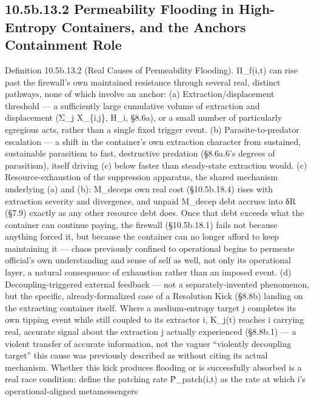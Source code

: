 \documentclass[
]{article}
\begin{document}
\hypertarget{b.13.2-permeability-flooding-in-high-entropy-containers-and-the-anchors-containment-role}{%
\subsection{10.5b.13.2 Permeability Flooding in High-Entropy Containers,
and the Anchors Containment
Role}\label{b.13.2-permeability-flooding-in-high-entropy-containers-and-the-anchors-containment-role}}

Definition 10.5b.13.2 (Real Causes of Permeability Flooding). Π\_f(i,t)
can rise past the firewall's own maintained resistance through several
real, distinct pathways, none of which involve an anchor: (a)
Extraction/displacement threshold --- a sufficiently large cumulative
volume of extraction and displacement (Σ\_j X\_\{i,j\}, H\_i, §8.6a), or
a small number of particularly egregious acts, rather than a single
fixed trigger event. (b) Parasite-to-predator escalation --- a shift in
the container's own extraction character from sustained, sustainable
parasitism to fast, destructive predation (§8.6a.6's degrees of
parasitism), itself driving (c) below faster than steady-state
extraction would. (c) Resource-exhaustion of the suppression apparatus,
the shared mechanism underlying (a) and (b): M\_deceps own real cost
(§10.5b.18.4) rises with extraction severity and divergence, and unpaid
M\_decep debt accrues into δR (§7.9) exactly as any other resource debt
does. Once that debt exceeds what the container can continue paying, the
firewall (§10.5b.18.1) fails not because anything forced it, but because
the container can no longer afford to keep maintaining it --- chaos
previously confined to operational begins to permeate official's own
understanding and sense of self as well, not only its operational layer,
a natural consequence of exhaustion rather than an imposed event. (d)
Decoupling-triggered external feedback --- not a separately-invented
phenomenon, but the specific, already-formalized case of a Resolution
Kick (§8.8b) landing on the extracting container itself. Where a
medium-entropy target j completes its own tipping event while still
coupled to its extractor i, K\_j(t) reaches i carrying real, accurate
signal about the extraction j actually experienced (§8.8b.1) --- a
violent transfer of accurate information, not the vaguer ``violently
decoupling target'' this cause was previously described as without
citing its actual mechanism. Whether this kick produces flooding or is
successfully absorbed is a real race condition: define the patching rate
Ṗ\_patch(i,t) as the rate at which i's operational-aligned metamessengers
\end{document}
